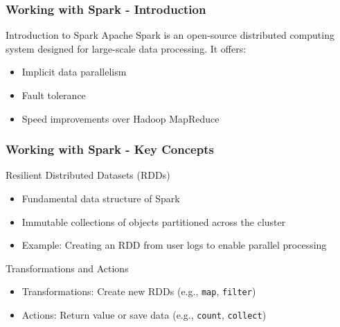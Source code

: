 \documentclass[aspectratio=169]{beamer}
\begin{document}
\begin{frame}[fragile]
    \frametitle{Working with Spark - Introduction}
    \begin{block}{Introduction to Spark}
        Apache Spark is an open-source distributed computing system designed for large-scale data processing. It offers:
        \begin{itemize}
            \item Implicit data parallelism
            \item Fault tolerance
            \item Speed improvements over Hadoop MapReduce
        \end{itemize}
    \end{block}
\end{frame}

\begin{frame}[fragile]
    \frametitle{Working with Spark - Key Concepts}
    \begin{block}{Resilient Distributed Datasets (RDDs)}
        \begin{itemize}
            \item Fundamental data structure of Spark
            \item Immutable collections of objects partitioned across the cluster
            \item Example: Creating an RDD from user logs to enable parallel processing
        \end{itemize}
    \end{block}
    
    \begin{block}{Transformations and Actions}
        \begin{itemize}
            \item Transformations: Create new RDDs (e.g., \texttt{map}, \texttt{filter})
            \item Actions: Return value or save data (e.g., \texttt{count}, \texttt{collect})
        \end{itemize}
    \end{block}
\end{frame}
\end{document}
